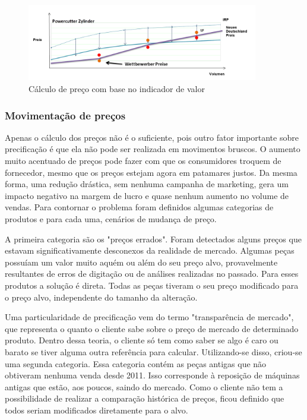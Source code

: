 \documentclass[12pt]{article}
\begin{document}
\begin{figure}[h!]
	\centering
	\includegraphics[width=0.9\textwidth]{img/wettbewerber.png}
	\caption{Cálculo de preço com base no indicador de valor}
	\label{fig:competitor}
\end{figure}

\subsubsection{Movimentação de preços}

	Apenas o cálculo dos preços não é o suficiente, pois outro fator importante sobre precificação é que ela não pode ser realizada em movimentos bruscos. O aumento muito acentuado de preços pode fazer com que os consumidores troquem de fornecedor, mesmo que os preços estejam agora em patamares justos. Da mesma forma, uma redução drástica, sem nenhuma campanha de marketing, gera um impacto negativo na margem de lucro e quase nenhum aumento no volume de vendas. Para contornar o problema foram definidos algumas categorias de produtos e para cada uma, cenários de mudança de preço.

	A primeira categoria são os "preços errados". Foram detectados alguns preços que estavam significativamente desconexos da realidade de mercado. Algumas peças possuíam um valor muito aquém ou além do seu preço alvo, provavelmente resultantes de erros de digitação ou de análises realizadas no passado. Para esses produtos a solução é direta. Todas as peças tiveram o seu preço modificado para o preço alvo, independente do tamanho da alteração.

	Uma particularidade de precificação vem do termo "transparência de mercado", que representa o quanto o cliente sabe sobre o preço de mercado de determinado produto. Dentro dessa teoria, o cliente só tem como saber se algo é caro ou barato se tiver alguma outra referência para calcular. Utilizando-se disso, criou-se uma segunda categoria. Essa categoria contém as peças antigas que não obtiveram nenhuma venda desde 2011. Isso corresponde à reposição de máquinas antigas que estão, aos poucos, saindo do mercado. Como o cliente não tem a possibilidade de realizar a comparação histórica de preços, ficou definido que todos seriam modificados diretamente para o alvo.
\end{document}
